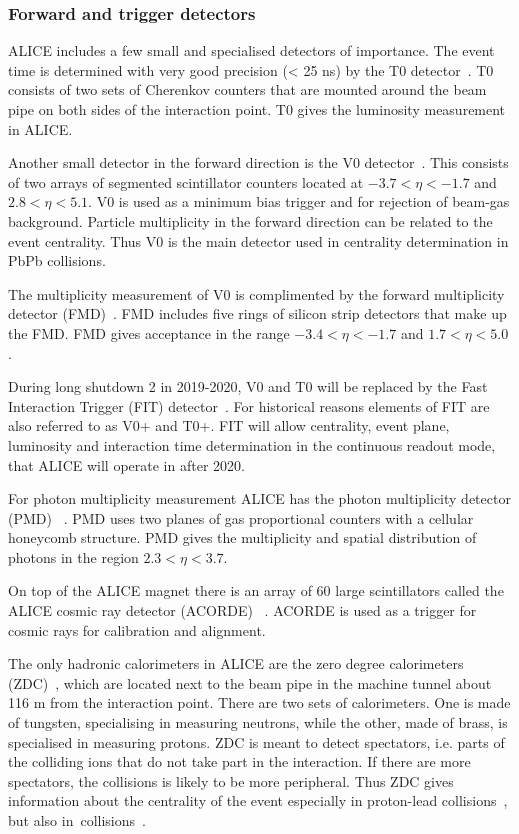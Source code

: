 \subsubsection{Forward and trigger detectors}
\label{sec:forward}
ALICE includes a few small and specialised detectors of importance. The event time is determined with very good precision (< 25 ns) by the T0 detector~\cite{Cortese:2004aa}. T0 consists of two sets of Cherenkov counters that are mounted around the beam pipe on both sides of the interaction point. T0 gives the luminosity measurement in ALICE.

Another small detector in the forward direction is the V0 detector~\cite{Cortese:2004aa}. This consists of two arrays of segmented scintillator counters located at $-3.7 < \eta < -1.7$ and $ 2.8 < \eta < 5.1$. V0 is used as a minimum bias trigger and for rejection of beam-gas background. Particle multiplicity in the forward direction can be related to the event centrality. Thus V0 is the main detector used in centrality determination in PbPb collisions.

The multiplicity measurement of V0 is complimented by the forward multiplicity detector (FMD)~\cite{Cortese:2004aa}. FMD includes five rings of silicon strip detectors that make up the FMD. FMD gives acceptance in the range $-3.4 < \eta < -1.7$ and $ 1.7 < \eta < 5.0$.

During long shutdown 2 in 2019-2020, V0 and T0 will be replaced by the Fast Interaction Trigger (FIT) detector~\cite{Maevskaya:2018ggm}. For historical reasons elements of FIT are also referred to as V0+ and T0+. FIT will allow centrality, event plane, luminosity and interaction time determination in the continuous readout mode, that ALICE will operate in after 2020.

For photon multiplicity measurement ALICE has the photon multiplicity detector (PMD) ~\cite{CERN-LHCC-99-032}. PMD uses two planes of gas proportional counters with a cellular honeycomb structure. PMD gives the multiplicity and spatial distribution of photons in the region $2.3 < \eta < 3.7$.

On top of the ALICE magnet there is an array of 60 large scintillators called the ALICE cosmic ray detector (ACORDE) ~\cite{Fernandez:2006ki}. ACORDE is used as a trigger for cosmic rays for calibration and alignment. 

The only hadronic calorimeters in ALICE are the zero degree calorimeters (ZDC)~\cite{Dellacasa:1999ke}, which are located next to the beam pipe in the machine tunnel about 116 m from the interaction point. There are two sets of calorimeters. One is made of tungsten, specialising in measuring neutrons, while the other, made of brass, is specialised in measuring protons. ZDC is meant to detect spectators, i.e. parts of the colliding ions that do not take part in the interaction. If there are more spectators, the collisions is likely to be more peripheral. Thus ZDC gives information about the centrality of the event especially in proton-lead collisions~\cite{Adam:2014qja}, but also in~\PbPb collisions~\cite{Abelev:2013qoq}.

